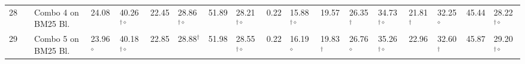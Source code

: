 \begin{table*}
{\begin{tabular}{ccllllllllllllllll}
28 &  &  Combo 4 on BM25 Bl. & 24.08  & 40.26$^{\dagger\diamond}$ & 22.45  & 28.86$^{\dagger\diamond}$ & 51.89  & 28.21$^{\dagger\diamond}$ & 0.22 & 15.88$^{\dagger\diamond}$ & 19.57  & 26.35$^{\dagger}$  & 34.73$^{\dagger\diamond}$ & 21.81$^{\dagger}$  & 32.25$^{\diamond}$  & 45.44  & 28.22$^{\dagger\diamond}$\tabularnewline
29 &  & Combo 5 on BM25 Bl. & 23.96$^{\diamond}$ & 40.18$^{\dagger\diamond}$ & 22.85  & 28.88$^{\dagger}$  & 51.98  & 28.55$^{\dagger\diamond}$ & 0.22 & 16.19$^{\diamond}$  & 19.83$^{\dagger}$  & 26.76$^{\diamond}$  & 35.26$^{\dagger\diamond}$ & 22.96  & 32.60$^{\dagger}$  & 45.87  & 29.20$^{\dagger\diamond}$\tabularnewline
\bottomrule
\end{tabular}} %
\end{table*}
